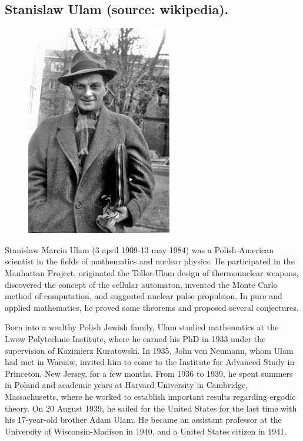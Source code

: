 \documentclass[english,graybox,envcountchap,envcountsame,sectrefs,shortlabels]{svmono}
\theoremstyle{style}
\begin{document}
\begin{subappendices}

\section{Stanislaw Ulam (source: wikipedia).}

\begin{figure} \centering

\includegraphics[scale=1.5]{ulam}

\end{figure}
Stanislaw Marcin Ulam (3 april 1909-13 may 1984) was a Polish-American scientist in the fields of mathematics and nuclear physics. He participated in the Manhattan Project, originated the Teller-Ulam design of thermonuclear weapons, discovered the concept of the cellular automaton, invented the Monte Carlo method of computation, and suggested nuclear pulse propulsion. In pure and applied mathematics, he proved some theorems and proposed several conjectures.

Born into a wealthy Polish Jewish family, Ulam studied mathematics at the Lwow Polytechnic Institute, where he earned his PhD in 1933 under the supervision of Kazimierz Kuratowski. In 1935, John von Neumann, whom Ulam had met in Warsaw, invited him to come to the Institute for Advanced Study in Princeton, New Jersey, for a few months. From 1936 to 1939, he spent summers in Poland and academic years at Harvard University in Cambridge, Massachusetts, where he worked to establish important results regarding ergodic theory. On 20 August 1939, he sailed for the United States for the last time with his 17-year-old brother Adam Ulam. He became an assistant professor at the University of Wisconsin-Madison in 1940, and a United States citizen in 1941.


\end{subappendices}
\end{document}
